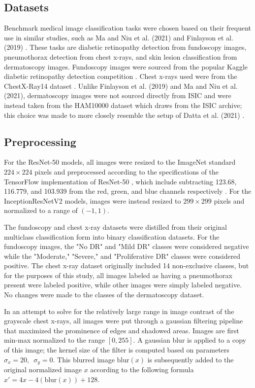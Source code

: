 \documentclass[10pt,twocolumn,letterpaper]{article}
\begin{document}
    \subsection{Datasets}
      Benchmark medical image classification tasks were chosen based on their frequent use in similar studies, such as Ma and Niu et al. (2021) \cite{MaNiu} and Finlayson et al. (2019) \cite{Finlayson}. These tasks are diabetic retinopathy detection from fundoscopy images, pneumothorax detection from chest x-rays, and skin lesion classification from dermatoscopy images. Fundoscopy images were sourced from the popular Kaggle diabetic retinopathy detection competition \cite{KaggleDR}. Chest x-rays used were from the ChestX-Ray14 dataset \cite{ChestX-Ray14}. Unlike Finlayson et al. (2019) \cite{Finlayson} and Ma and Niu et al. \cite{MaNiu} (2021), dermatoscopy images were not sourced directly from ISIC \cite{ISIC} and were instead taken from the HAM10000 dataset \cite{HAM10000} which draws from the ISIC archive; this choice was made to more closely resemble the setup of Datta et al. (2021) \cite{AttentionSkinCancerClassification}.

    \subsection{Preprocessing}
      For the ResNet-50 models, all images were resized to the ImageNet standard $224 \times 224$ pixels \cite{ImageNet} and preprocessed according to the specifications of the TensorFlow \cite{TensorFlow} implementation of ResNet-50 \cite{ResNet}, which include subtracting 123.68, 116.779, and 103.939 from the red, green, and blue channels respectively \cite{ResNetPreprocessingImplementation}. For the InceptionResNetV2 models, images were instead resized to $299 \times 299$ pixels and normalized to a range of $(-1, 1)$.

      The fundoscopy and chest x-ray datasets were distilled from their original multiclass classification form into binary classification datasets. For the fundoscopy images, the "No DR" and "Mild DR" classes were considered negative while the "Moderate," "Severe," and "Proliferative DR" classes were considered positive. The chest x-ray dataset originally included 14 non-exclusive classes, but for the purposes of this study, all images labeled as having a pneumothorax present were labeled positive, while other images were simply labeled negative. No changes were made to the classes of the dermatoscopy dataset.

      In an attempt to solve for the relatively large range in image contrast of the grayscale chest x-rays, all images were put through a gaussian filtering pipeline that maximized the prominence of edges and shadowed areas. Images are first min-max normalized to the range $[0,255]$. A gaussian blur is applied to a copy of this image; the kernel size of the filter is computed based on parameters $\sigma_x=20,\,\,\, \sigma_y=0$. This blurred image $\text{blur}(x)$ is subsequently added to the original normalized image $x$ according to the following formula $x' = 4x - 4(\text{blur}(x)) + 128$.
\end{document}
